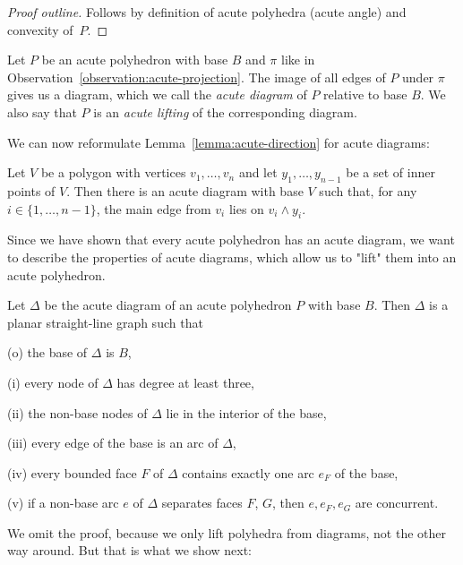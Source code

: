 \begin{proof}[Proof outline]
  Follows by definition of acute polyhedra (acute angle) and convexity of~$P$.
\end{proof}

\begin{definition}
  Let $P$ be an acute polyhedron with base $B$ and $\pi$ like in Observation~\ref{observation:acute-projection}.
  The image of all edges of $P$ under $\pi$ gives us a diagram, which we call the \emph{acute diagram} of $P$ relative to base $B$. 
  We also say that $P$ is an \emph{acute lifting} of the corresponding diagram.
\end{definition}

We can now reformulate Lemma~\ref{lemma:acute-direction} for acute diagrams:

\begin{corollary}\label{corollary:acute-direction}
  Let $V$ be a polygon with vertices $v_1,\dots,v_n$ and let $y_1,\dots,y_{n-1}$ be a set of inner points of $V$.
  Then there is an acute diagram with base $V$ such that, for any $i \in \{1,\dots,n-1\}$, the main edge from $v_i$ lies on $v_i \wedge y_i$.
\end{corollary}

Since we have shown that every acute polyhedron has an acute diagram, we want to describe the properties of acute diagrams, which allow us to "lift" them into an acute polyhedron.

\begin{lemma}\label{lemma:diagram-properties}
  Let $\Delta$ be the acute diagram of an acute polyhedron $P$ with base $B$.
  Then $\Delta$ is a planar straight-line graph such that

  (o) the base of $\Delta$ is $B$,
  
  (i) every node of $\Delta$ has degree at least three,

  (ii) the non-base nodes of $\Delta$ lie in the interior of the base,

  (iii) every edge of the base is an arc of $\Delta$,

  (iv) every bounded face $F$ of $\Delta$ contains exactly one arc $e_F$ of the base,

  (v) if a non-base arc $e$ of $\Delta$ separates faces $F$, $G$, then $e, e_F, e_G$ are concurrent.
\end{lemma}

We omit the proof, because we only lift polyhedra from diagrams, not the other way around. But that is what we show next:

